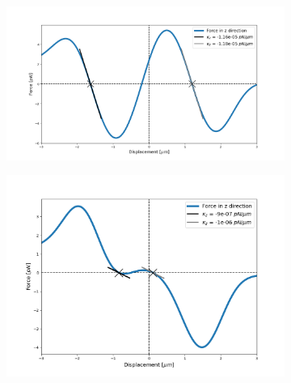 \documentclass[preprint,  3p]{elsarticle}
\begin{document}
\begin{figure}
	\begin{subfigure}{.475\linewidth}
		\includegraphics[width=\linewidth]{Images/lam=2_theta=180.png}
		\caption{}
		\label{lam=2_inverted}
	\end{subfigure}\hfill %
	\begin{subfigure}{.475\linewidth}
		\includegraphics[width=\linewidth]{Images/lam=4_theta=180.png}
		\caption{}
		\label{lam=4_inverted}
	\end{subfigure}
	

\end{figure}
\end{document}
